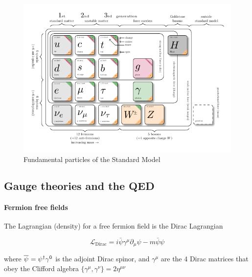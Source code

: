 \begin{figure}[h!]
    \centering
    \includegraphics[width=1\linewidth]{fig//chap02-theory/sm-particles.pdf}
    \caption{Fundamental particles of the Standard Model \cite{BurgardCarstenStandardExample}}
    \label{fig:SMpart}
\end{figure}

\subsection{Gauge theories and the QED}
\paragraph*{Fermion free fields}
The Lagrangian (density) for a free fermion field is the Dirac Lagrangian

\begin{equation}\label{eq:Dirac}
\mathcal{L}_{\text{Dirac}}=i\bar{\psi}\gamma^{\mu}\partial_{\mu}\psi-m\bar{\psi}\psi
\end{equation}

where $\aff{\psi}{}=\ff{\psi}{}^\dagger\gamma^0$ is the adjoint Dirac spinor, and $\gamma^\mu$ are the 4 Dirac matrices that obey the Clifford algebra $\{\gamma^\mu,\gamma^\nu\}=2\eta^{\mu\nu}$
